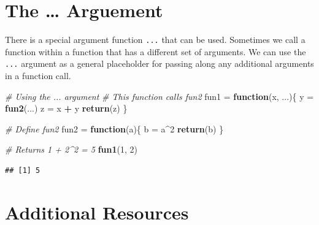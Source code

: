 \documentclass[
]{book}
\newenvironment{Shaded}{\begin{snugshade}}{\end{snugshade}}
\newcommand{\CommentTok}[1]{\textcolor[rgb]{0.56,0.35,0.01}{\textit{#1}}}
\newcommand{\ControlFlowTok}[1]{\textcolor[rgb]{0.13,0.29,0.53}{\textbf{#1}}}
\newcommand{\DecValTok}[1]{\textcolor[rgb]{0.00,0.00,0.81}{#1}}
\newcommand{\KeywordTok}[1]{\textcolor[rgb]{0.13,0.29,0.53}{\textbf{#1}}}
\newcommand{\NormalTok}[1]{#1}
\newcommand{\OperatorTok}[1]{\textcolor[rgb]{0.81,0.36,0.00}{\textbf{#1}}}
\newcommand{\StringTok}[1]{\textcolor[rgb]{0.31,0.60,0.02}{#1}}
\begin{document}
\hypertarget{the-arguement}{%
\section{The \ldots{} Arguement}\label{the-arguement}}

There is a special argument function \texttt{...} that can be used. Sometimes we call a function within a function that has a different set of arguments. We can use the \texttt{...} argument as a general placeholder for passing along any additional arguments in a function call.

\begin{Shaded}
\begin{Highlighting}[]
\CommentTok{# Using the ... argument}
\CommentTok{# This function calls fun2}
\NormalTok{fun1 =}\StringTok{ }\ControlFlowTok{function}\NormalTok{(x, ...)\{}
\NormalTok{  y =}\StringTok{ }\KeywordTok{fun2}\NormalTok{(...)}
\NormalTok{  z =}\StringTok{ }\NormalTok{x }\OperatorTok{+}\StringTok{ }\NormalTok{y }
  \KeywordTok{return}\NormalTok{(z)}
\NormalTok{\}}

\CommentTok{# Define fun2 }
\NormalTok{fun2 =}\StringTok{ }\ControlFlowTok{function}\NormalTok{(a)\{}
\NormalTok{  b =}\StringTok{ }\NormalTok{a}\OperatorTok{^}\DecValTok{2}
  \KeywordTok{return}\NormalTok{(b)}
\NormalTok{\}}

\CommentTok{# Returns 1 + 2^2 = 5}
\KeywordTok{fun1}\NormalTok{(}\DecValTok{1}\NormalTok{, }\DecValTok{2}\NormalTok{)}
\end{Highlighting}
\end{Shaded}

\begin{verbatim}
## [1] 5
\end{verbatim}

\hypertarget{additional-resources-2}{%
\section{Additional Resources}\label{additional-resources-2}}
\end{document}
